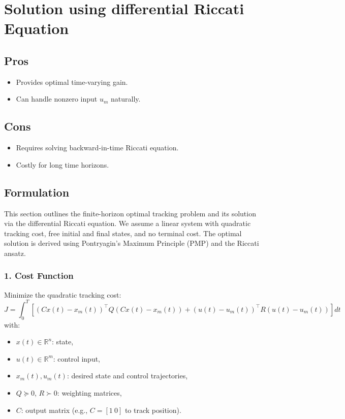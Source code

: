 \documentclass[11pt]{article}
\begin{document}
\section{Solution using differential Riccati Equation}

\subsection*{Pros}
\begin{itemize}[noitemsep]
    \item Provides optimal time-varying gain.
    \item Can handle nonzero input $u_m$ naturally.
\end{itemize}

\subsection*{Cons}
\begin{itemize}[noitemsep]
    \item Requires solving backward-in-time Riccati equation.
    \item Costly for long time horizons.
\end{itemize}

\subsection*{Formulation}
This section outlines the finite-horizon optimal tracking problem 
and its solution via the differential Riccati equation. 
We assume a linear system with quadratic tracking cost, 
free initial and final states, and no terminal cost. 
The optimal solution is derived using Pontryagin’s Maximum Principle (PMP) and the Riccati ansatz.

\subsubsection*{1. Cost Function}

Minimize the quadratic tracking cost:
\begin{equation}
J = \int_0^T \left[(C x(t) - x_m(t))^\top Q (C x(t) - x_m(t)) + (u(t) - u_m(t))^\top R (u(t) - u_m(t))\right] dt
\end{equation}
with:
\begin{itemize}
    \item \(x(t) \in \mathbb{R}^n\): state,
    \item \(u(t) \in \mathbb{R}^m\): control input,
    \item \(x_m(t), u_m(t)\): desired state and control trajectories,
    \item \(Q \succeq 0\), \(R \succ 0\): weighting matrices,
    \item \(C\): output matrix (e.g., \(C = [1\ 0]\) to track position).
\end{itemize}
\end{document}
